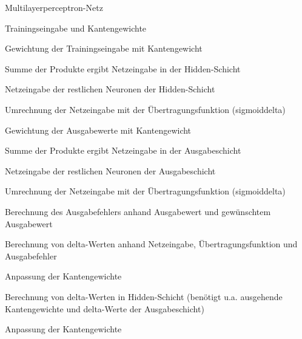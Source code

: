 \begin{frame}[c]
  \begin{itemize}
     {
      \item Multilayerperceptron-Netz
    }
     {
      \item Trainingseingabe und Kantengewichte
    }
     {
      \item Gewichtung der Trainingseingabe mit Kantengewicht
    }
     {
      \item Summe der Produkte ergibt Netzeingabe in der Hidden-Schicht
    }
     {
      \item Netzeingabe der restlichen Neuronen der Hidden-Schicht
    }
     {
      \item Umrechnung der Netzeingabe mit der Übertragungsfunktion (sigmoiddelta)
    }
     {
      \item Gewichtung der Ausgabewerte mit Kantengewicht
    }
     {
      \item Summe der Produkte ergibt Netzeingabe in der Ausgabeschicht
    }
     {
      \item Netzeingabe der restlichen Neuronen der Ausgabeschicht
    }
     {
      \item Umrechnung der Netzeingabe mit der Übertragungsfunktion (sigmoiddelta)
    }
     {
      \item Berechnung des Ausgabefehlers anhand Ausgabewert und gewünschtem Ausgabewert
    }
     {
      \item Berechnung von delta-Werten anhand Netzeingabe, Übertragungsfunktion und Ausgabefehler 
    }
     {
      \item Anpassung der Kantengewichte
    }
     {
      \item Berechnung von delta-Werten in Hidden-Schicht (benötigt u.a. ausgehende Kantengewichte und delta-Werte der Ausgabeschicht)
    }
     {
      \item Anpassung der Kantengewichte
    }
   \end{itemize}
  

\end{frame}
